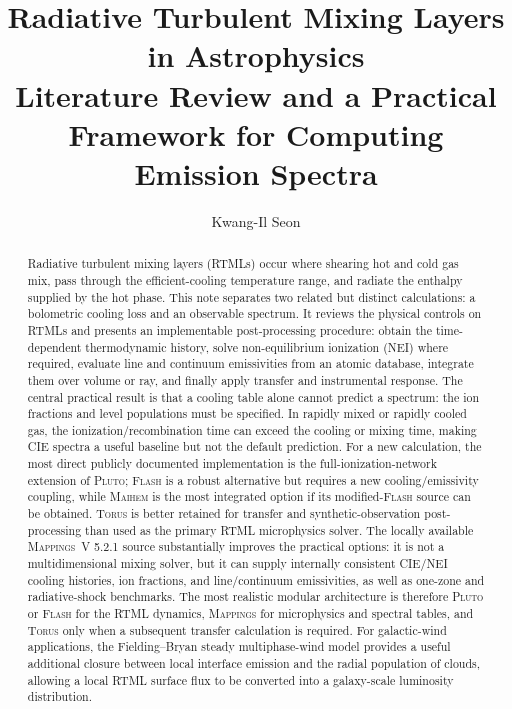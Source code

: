 \documentclass[english,a4paper]{my_memo2}
\title{\textbf{Radiative Turbulent Mixing Layers in Astrophysics}\\
\large Literature Review and a Practical Framework for Computing Emission Spectra}
\author{Kwang-Il Seon}
\date{\docmoddate}
\begin{document}
\maketitle

\begin{abstract}
Radiative turbulent mixing layers (RTMLs) occur where shearing hot and cold
gas mix, pass through the efficient-cooling temperature range, and radiate the
enthalpy supplied by the hot phase.  This note separates two related but
distinct calculations: a bolometric cooling loss and an observable spectrum.
It reviews the physical controls on RTMLs and presents an implementable
post-processing procedure: obtain the time-dependent thermodynamic history,
solve non-equilibrium ionization (NEI) where required, evaluate line and
continuum emissivities from an atomic database, integrate them over volume or
ray, and finally apply transfer and instrumental response.  The central
practical result is that a cooling table alone cannot predict a spectrum: the
ion fractions and level populations must be specified.  In rapidly mixed or
rapidly cooled gas, the ionization/recombination time can exceed the cooling
or mixing time, making CIE spectra a useful baseline but not the default
prediction.
For a new calculation, the most direct publicly documented implementation is
the full-ionization-network extension of \textsc{Pluto}; \textsc{Flash} is a
robust alternative but requires a new cooling/emissivity coupling, while
\textsc{Maihem} is the most integrated option if its modified-\textsc{Flash}
source can be obtained.  \textsc{Torus} is better retained for transfer and
synthetic-observation post-processing than used as the primary RTML
microphysics solver.  The locally available \textsc{Mappings~V} 5.2.1 source
substantially improves the practical options: it is not a multidimensional
mixing solver, but it can supply internally consistent CIE/NEI cooling
histories, ion fractions, and line/continuum emissivities, as well as
one-zone and radiative-shock benchmarks.  The most realistic modular
architecture is therefore \textsc{Pluto} or \textsc{Flash} for the RTML
dynamics, \textsc{Mappings} for microphysics and spectral tables, and
\textsc{Torus} only when a subsequent transfer calculation is required.  For
galactic-wind applications, the Fielding--Bryan steady multiphase-wind model
provides a useful additional closure between local interface emission and the
radial population of clouds, allowing a local RTML surface flux to be
converted into a galaxy-scale luminosity distribution.
\end{abstract}
\end{document}
